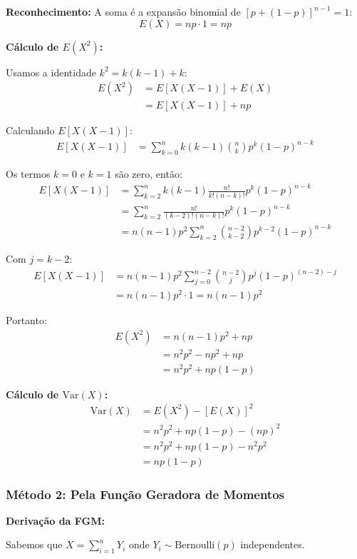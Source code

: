 \documentclass[12pt,a4paper]{article}
\theoremstyle{plain}
\theoremstyle{definition}
\theoremstyle{remark}
\begin{document}
\textbf{Reconhecimento:} A soma é a expansão binomial de \([p + (1-p)]^{n-1} = 1\):
\[
E(X) = np \cdot 1 = np
\]

\textbf{Cálculo de \(E(X^2)\):}

Usamos a identidade \(k^2 = k(k-1) + k\):
\begin{align}
E(X^2) &= E[X(X-1)] + E(X) \\
&= E[X(X-1)] + np
\end{align}

Calculando \(E[X(X-1)]\):
\begin{align}
E[X(X-1)] &= \sum_{k=0}^{n} k(k-1) \binom{n}{k} p^k (1-p)^{n-k}
\end{align}

Os termos \(k=0\) e \(k=1\) são zero, então:
\begin{align}
E[X(X-1)] &= \sum_{k=2}^{n} k(k-1) \frac{n!}{k!(n-k)!} p^k (1-p)^{n-k} \\
&= \sum_{k=2}^{n} \frac{n!}{(k-2)!(n-k)!} p^k (1-p)^{n-k} \\
&= n(n-1)p^2 \sum_{k=2}^{n} \binom{n-2}{k-2} p^{k-2} (1-p)^{n-k}
\end{align}

Com \(j = k-2\):
\begin{align}
E[X(X-1)] &= n(n-1)p^2 \sum_{j=0}^{n-2} \binom{n-2}{j} p^j (1-p)^{(n-2)-j} \\
&= n(n-1)p^2 \cdot 1 = n(n-1)p^2
\end{align}

Portanto:
\begin{align}
E(X^2) &= n(n-1)p^2 + np \\
&= n^2p^2 - np^2 + np \\
&= n^2p^2 + np(1-p)
\end{align}

\textbf{Cálculo de \(\text{Var}(X)\):}
\begin{align}
\text{Var}(X) &= E(X^2) - [E(X)]^2 \\
&= n^2p^2 + np(1-p) - (np)^2 \\
&= n^2p^2 + np(1-p) - n^2p^2 \\
&= np(1-p)
\end{align}

\subsubsection{Método 2: Pela Função Geradora de Momentos}

\textbf{Derivação da FGM:}

Sabemos que \(X = \sum_{i=1}^{n} Y_i\) onde \(Y_i \sim \text{Bernoulli}(p)\) independentes.
\end{document}
